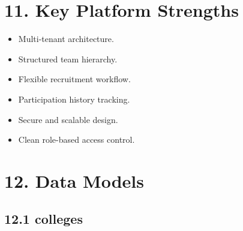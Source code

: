\documentclass[12pt]{article}
\begin{document}
\section*{11. Key Platform Strengths}

\begin{itemize}
    \item Multi-tenant architecture.
    \item Structured team hierarchy.
    \item Flexible recruitment workflow.
    \item Participation history tracking.
    \item Secure and scalable design.
    \item Clean role-based access control.
\end{itemize}

\section*{12. Data Models}

\subsection*{12.1 colleges}
\end{document}
